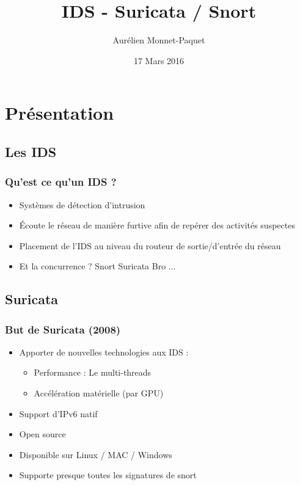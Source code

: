 \documentclass{beamer}
\title{IDS - Suricata / Snort}
\author{Aurélien Monnet-Paquet}
\institute{www.inria.fr}
\date{17 Mars 2016}
\begin{document}
\begin{frame}
\titlepage
\end{frame}

\section{Présentation}
\subsection{Les IDS}
\begin{frame}
\frametitle{Qu'est ce qu'un IDS ?}
\begin{itemize}
[triangle]
\item Systèmes de détection d'intrusion
\item Écoute le réseau de manière furtive afin de repérer des activités suspectes
\pause
\item Placement de l'IDS au niveau du routeur de sortie/d'entrée du réseau
\pause
\item Et la concurrence ? Snort Suricata Bro ...
\end{itemize}
\end{frame}

\subsection{Suricata}
\begin{frame}
\frametitle{But de Suricata (2008)}
\begin{itemize}
[triangle]
\item Apporter de nouvelles technologies aux IDS :
\begin{itemize}
\item Performance : Le multi-threads
\item Accélération matérielle (par GPU)
\end{itemize}
\item Support d'IPv6 natif
\item Open source
\item Disponible sur Linux / MAC / Windows
\item Supporte presque toutes les signatures de snort
\end{itemize}
\end{frame}

\end{document}

